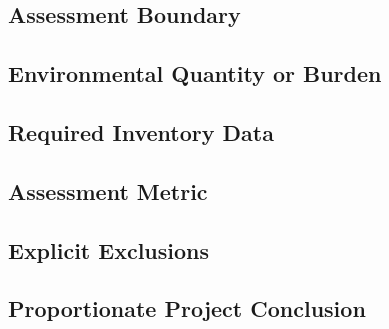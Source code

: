 %

\subsection{Assessment Boundary}
\label{sec:res-sus-cmp-assessment-boundary}


\subsection{Environmental Quantity or Burden}
\label{sec:res-sus-cmp-environmental-quantity-burden}


\subsection{Required Inventory Data}
\label{sec:res-sus-cmp-required-inventory-data}


\subsection{Assessment Metric}
\label{sec:res-sus-cmp-assessment-metric}


\subsection{Explicit Exclusions}
\label{sec:res-sus-cmp-explicit-exclusions}


\subsection{Proportionate Project Conclusion}
\label{sec:res-sus-cmp-proportionate-project-conclusion}


